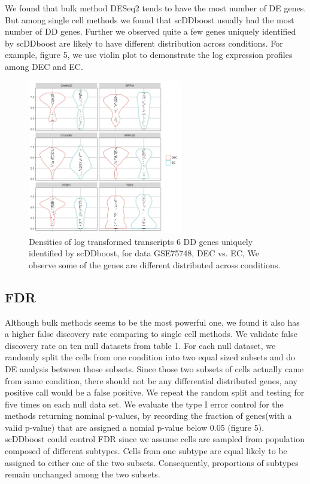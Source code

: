 \documentclass[11pt]{amsart}
\begin{document}
We found that bulk method DESeq2 tends to have the most number of DE genes. But among single cell methods we found that scDDboost usually had the most number of DD genes. Further we observed quite a few genes uniquely identified by scDDboost are likely to have different distribution across conditions. For example, figure 5, we use violin plot to demonstrate the log expression profiles among DEC and EC. \\
\begin{figure}[H]
\includegraphics[width = 0.6\textwidth]{density_DEC_dd.png}
 \caption{ Densities of log transformed transcripts 6 DD genes uniquely identified by scDDboost, for data GSE75748, DEC vs. EC, We observe some of the genes are different distributed across conditions.}
  \label{fig:6}
\end{figure}

\subsection{FDR}
Although bulk methods seems to be the most powerful one, we found it also has a higher false discovery rate comparing to single cell methods. We validate false discovery rate on ten null datasets from table 1. For each null dataset, we randomly split the cells from one condition into two equal sized subsets and do DE analysis between those subsets. Since those two subsets of cells actually came from same condition, there should not be any differential distributed genes, any positive call would be a false positive. We repeat the random split and testing for five times on each null data set. We evaluate the type I error control for the methods returning nominal p-values, by recording the fraction of genes(with a valid p-value) that are assigned a nomial p-value below 0.05 (figure 5).\\
scDDboost could control FDR since we assume cells are sampled from population composed of different subtypes. Cells from one subtype are equal likely to be assigned to either one of the two subsets. Consequently, proportions of subtypes remain unchanged among the two subsets.
\end{document}
